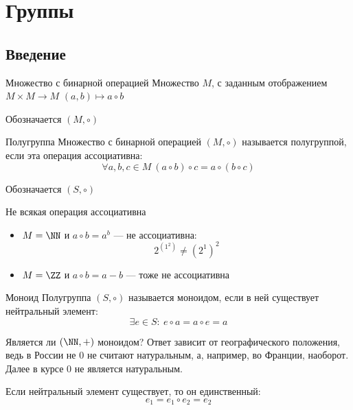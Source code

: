 \section{Группы}

\subsection{Введение}

\begin{defn}{Множество с бинарной операцией}{}
    Множество \( M \), с заданным отображением \( M \times M \to M \) \( (a, b) \mapsto a \circ b \)

    Обозначается \( (M, \circ) \)
\end{defn}

\begin{defn}{Полугруппа}{}
    Множество с бинарной операцией \( (M, \circ) \) называется полугруппой,
    если эта операция ассоциативна:
    \[
        \forall a, b, c \in M \ (a \circ b) \circ c = a \circ (b \circ c)
    \]

    Обозначается \( (S, \circ) \)
\end{defn}

\begin{example}{Не всякая операция ассоциативна}{}
    \begin{itemize}
        \item
            \( M = \NN \) и \( a \circ b = a^b \) --- не ассоциативна:
            \[
                2^{(1^2)} \neq (2^1)^2
            \]
        \item
            \( M = \ZZ \) и \( a \circ b = a - b \) --- тоже не ассоциативна
    \end{itemize}
\end{example}

\begin{defn}{Моноид}{}
    Полугруппа \( (S, \circ) \) называется моноидом,
    если в ней существует нейтральный элемент:
    \[
        \exists e \in S: \ e \circ a = a \circ e = a
    \]
\end{defn}

\begin{example}{}{}
    Является ли \( (\NN, +) \) моноидом?
    Ответ зависит от географического положения,
    ведь в России не \( 0 \) не считают натуральным,
    а, например, во Франции, наоборот.
    Далее в курсе \( 0 \) не является натуральным.
\end{example}

\begin{remark}{}{}
    Если нейтральный элемент существует, то он единственный:
    \[
        e_1 = e_1 \circ e_2 = e_2
    \]
\end{remark}

